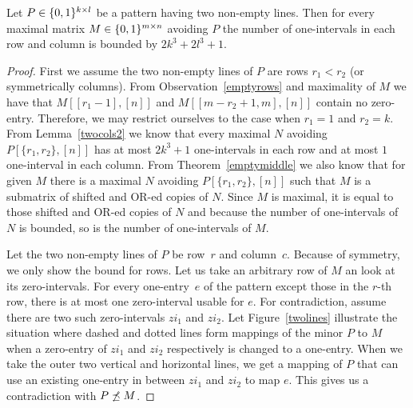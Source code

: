 \begin{lemma}
Let $P\in\{0,1\}^{k\times l}$ be a pattern having two non-empty lines. Then for every maximal matrix $M\in\{0,1\}^{m\times n}$ avoiding $P$ the number of one-intervals in each row and column is bounded by $2k^3+2l^3+1$. 
\end{lemma}
\begin{proof}
First we assume the two non-empty lines of $P$ are rows $r_1<r_2$ (or symmetrically columns). From Observation~\ref{emptyrows} and maximality of $M$ we have that $M[[r_1-1],[n]]$ and $M[[m-r_2+1,m],[n]]$ contain no zero-entry. Therefore, we may restrict ourselves to the case when $r_1=1$ and $r_2=k$. From Lemma~\ref{twocols2} we know that every maximal $N$ avoiding $P[\{r_1,r_2\},[n]]$ has at most $2k^3+1$ one-intervals in each row and at most $1$ one-interval in each column. From Theorem~\ref{emptymiddle} we also know that for given $M$ there is a maximal $N$ avoiding $P[\{r_1,r_2\},[n]]$ such that $M$ is a submatrix of shifted and OR-ed copies of $N$. Since $M$ is maximal, it is equal to those shifted and OR-ed copies of $N$ and because the number of one-intervals of $N$ is bounded, so is the number of one-intervals of $M$.

Let the two non-empty lines of $P$ be row~$r$ and column~$c$. Because of symmetry, we only show the bound for rows. Let us take an arbitrary row of $M$ an look at its zero-intervals. For every one-entry~$e$ of the pattern except those in the $r$-th row, there is at most one zero-interval usable for $e$. For contradiction, assume there are two such zero-intervals $zi_1$ and $zi_2$. Let Figure~\ref{twolines} illustrate the situation where dashed and dotted lines form mappings of the minor $P$ to $M$ when a zero-entry of $zi_1$ and $zi_2$ respectively is changed to a one-entry. When we take the outer two vertical and horizontal lines, we get a mapping of $P$ that can use an existing one-entry in between $zi_1$ and $zi_2$ to map $e$. This gives us a contradiction with $P\not\preceq M$.


\end{proof}
